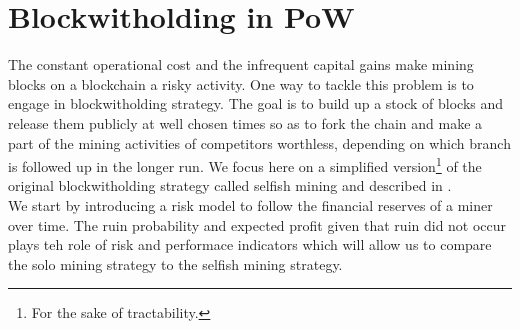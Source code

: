 \section{Blockwitholding in PoW}\label{sec:blockwithholding}
The constant operational cost and the infrequent capital gains make mining blocks on a \PoW blockchain a risky activity. One way to tackle this problem is to engage in blockwitholding strategy. The goal is to build up a stock of blocks and release them publicly at well chosen times so as to fork the chain and make a part of the mining activities of competitors worthless, depending on which branch is followed up in the longer run. We focus here on a simplified version\footnote{For the sake of tractability.} of the original blockwitholding strategy called selfish mining and described in \citet{Eyal2014}. \\

\noindent We start by introducing a risk model to follow the financial reserves of a miner over time. The ruin probability and expected profit given that ruin did not occur plays teh role of risk and performace indicators which will allow us to compare the solo mining strategy to the selfish mining strategy.

